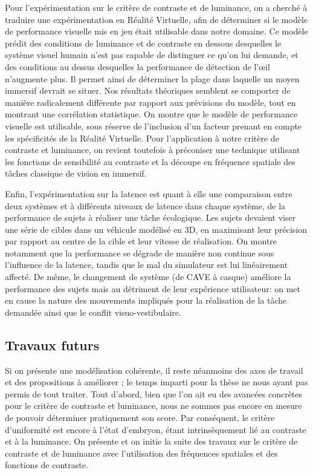 	\par Pour l'expérimentation sur le critère de contraste et de luminance, on a cherché à traduire une expérimentation en Réalité Virtuelle, afin de déterminer si le modèle de performance visuelle mis en jeu était utilisable dans notre domaine. Ce modèle prédit des conditions de luminance et de contraste en dessous desquelles le système visuel humain n'est pas capable de distinguer ce qu'on lui demande, et des conditions au dessus desquelles la performance de détection de l'œil n'augmente plus. Il permet ainsi de déterminer la plage dans laquelle un moyen immersif devrait se situer. Nos résultats théoriques semblent se comporter de manière radicalement différente par rapport aux prévisions du modèle, tout en montrant une corrélation statistique. On montre que le modèle de performance visuelle est utilisable, sous réserve de l'inclusion d'un facteur prenant en compte les spécificités de la Réalité Virtuelle. Pour l'application à notre critère de contraste et luminance, on revient toutefois à préconiser une technique utilisant les fonctions de sensibilité au contraste et la découpe en fréquence spatiale des tâches classique de vision en immersif.
	
	\par Enfin, l'expérimentation sur la latence est quant à elle une comparaison entre deux systèmes et à différents niveaux de latence dans chaque système, de la performance de sujets à réaliser une tâche écologique. Les sujets devaient viser une série de cibles dans un véhicule modélisé en 3D, en maximisant leur précision par rapport au centre de la cible et leur vitesse de réalisation. On montre notamment que la performance se dégrade de manière non continue sous l'influence de la latence, tandis que le mal du simulateur est lui linéairement affecté. De même, le changement de système (de CAVE à casque) améliore la performance des sujets mais au détriment de leur expérience utilisateur: on met en cause la nature des mouvements impliqués pour la réalisation de la tâche demandée ainsi que le conflit visuo-vestibulaire.

	\subsection*{Travaux futurs}
	\par Si on présente une modélisation cohérente, il reste néanmoins des axes de travail et des propositions à améliorer ; le temps imparti pour la thèse ne nous ayant pas permis de tout traiter. Tout d'abord, bien que l'on ait eu des avancées concrètes pour le critère de contraste et luminance, nous ne sommes pas encore en mesure de pouvoir déterminer pratiquement son score. Par conséquent, le critère d'uniformité est encore à l'état d'embryon, étant intrinsèquement lié au contraste et à la luminance. On présente et on initie la suite des travaux sur le critère de contraste et de luminance avec l'utilisation des fréquences spatiales et des fonctions de contraste.
	
